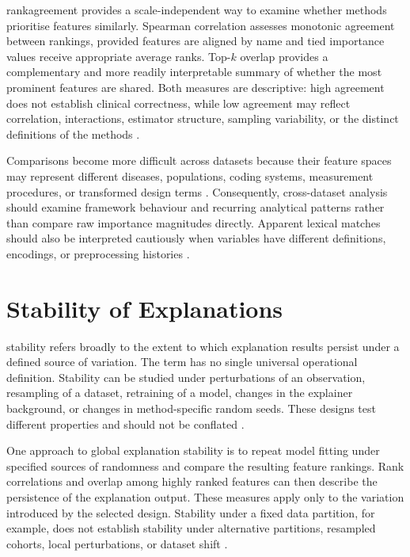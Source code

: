 \Gls{rankagreement} provides a scale-independent way to examine whether methods prioritise features similarly. Spearman correlation assesses monotonic agreement between rankings, provided features are aligned by name and tied importance values receive appropriate average ranks. Top-$k$ overlap provides a complementary and more readily interpretable summary of whether the most prominent features are shared. Both measures are descriptive: high agreement does not establish clinical correctness, while low agreement may reflect correlation, interactions, estimator structure, sampling variability, or the distinct definitions of the methods \citep{mohseni_multidisciplinary_2021, vilone_classification_2021}.

Comparisons become more difficult across datasets because their feature spaces may represent different diseases, populations, coding systems, measurement procedures, or transformed design terms \citep{moons_probastai_2025}. Consequently, cross-dataset analysis should examine framework behaviour and recurring analytical patterns rather than compare raw importance magnitudes directly. Apparent lexical matches should also be interpreted cautiously when variables have different definitions, encodings, or preprocessing histories \citep{vilone_classification_2021, mohseni_multidisciplinary_2021}.

\section{Stability of Explanations}

\Gls{stability} refers broadly to the extent to which explanation results persist under a defined source of variation. The term has no single universal operational definition. Stability can be studied under perturbations of an observation, resampling of a dataset, retraining of a model, changes in the explainer background, or changes in method-specific random seeds. These designs test different properties and should not be conflated \citep{lofstrom_meta_2022, canha_functionally-grounded_2025}.

One approach to global explanation stability is to repeat model fitting under specified sources of randomness and compare the resulting feature rankings. Rank correlations and overlap among highly ranked features can then describe the persistence of the explanation output. These measures apply only to the variation introduced by the selected design. Stability under a fixed data partition, for example, does not establish stability under alternative partitions, resampled cohorts, local perturbations, or dataset shift \citep{lofstrom_meta_2022, canha_functionally-grounded_2025}.

